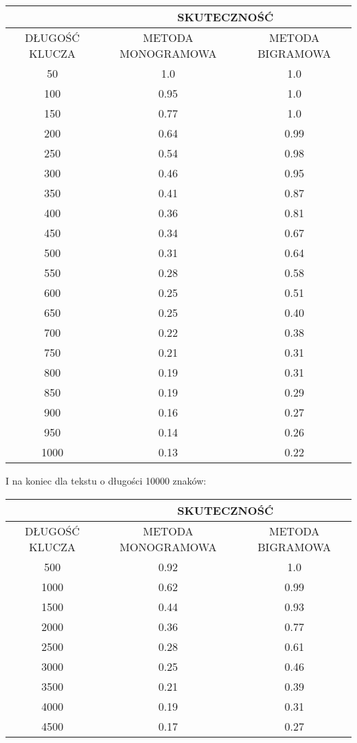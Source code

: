 \documentclass[a4paper]{article}
\begin{document}
\begin{center}\begin{tabular}{
|c|c|c|}
\hline &\multicolumn{2}{|c|}{SKUTECZNOŚĆ} \\
\hline DŁUGOŚĆ KLUCZA & METODA MONOGRAMOWA & METODA BIGRAMOWA\\ \hline
50
 & 1.0 & 1.0\\ \hline
100
 & 0.95 & 1.0\\ \hline
150
 & 0.77 & 1.0\\ \hline
200
 & 0.64 & 0.99\\ \hline
250
 & 0.54 & 0.98\\ \hline
300
 & 0.46 & 0.95\\ \hline
350
 & 0.41 & 0.87\\ \hline
400
 & 0.36 & 0.81\\ \hline
450
 & 0.34 & 0.67\\ \hline
500
 & 0.31 & 0.64\\ \hline
550
 & 0.28 & 0.58\\ \hline
600
 & 0.25 & 0.51\\ \hline
650
 & 0.25 & 0.40\\ \hline
700
 & 0.22 & 0.38\\ \hline
750
 & 0.21 & 0.31\\ \hline
800
 & 0.19 & 0.31\\ \hline
850
 & 0.19 & 0.29\\ \hline
900
 & 0.16 & 0.27\\ \hline
950
 & 0.14 & 0.26\\ \hline
1000
 & 0.13 & 0.22\\ \hline
\end{tabular}\end{center}
I na koniec dla tekstu o długości 10000 znaków:
\begin{center}\begin{tabular}{
|c|c|c|}
\hline &\multicolumn{2}{|c|}{SKUTECZNOŚĆ} \\
\hline DŁUGOŚĆ KLUCZA & METODA MONOGRAMOWA & METODA BIGRAMOWA\\ \hline
500
 & 0.92 & 1.0\\ \hline
1000
 & 0.62 & 0.99\\ \hline
1500
 & 0.44 & 0.93\\ \hline
2000
 & 0.36 & 0.77\\ \hline
2500
 & 0.28 & 0.61\\ \hline
3000
 & 0.25 & 0.46\\ \hline
3500
 & 0.21 & 0.39\\ \hline
4000
 & 0.19 & 0.31\\ \hline
4500
 & 0.17 & 0.27\\ \hline
\end{tabular}\end{center}
\end{document}
